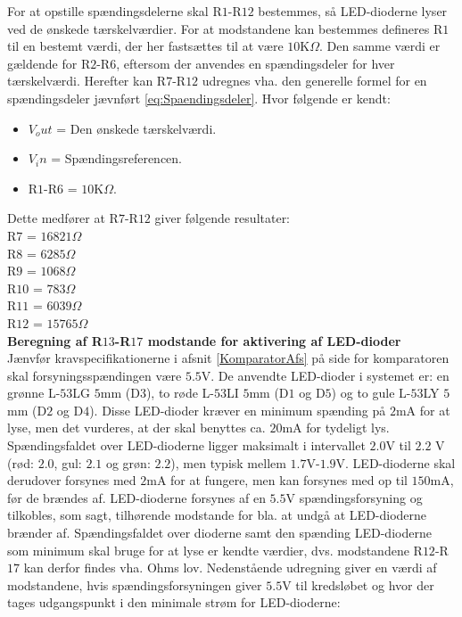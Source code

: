 For at opstille spændingsdelerne skal R$1$-R$12$ bestemmes, så LED-dioderne lyser ved de ønskede tærskelværdier. For at modstandene kan bestemmes defineres R$1$ til en bestemt værdi, der her fastsættes til at være $10$K$\Omega$. Den samme værdi er gældende for R$2$-R$6$, eftersom der anvendes en spændingsdeler for hver tærskelværdi. Herefter kan R$7$-R$12$ udregnes vha. den generelle formel for en spændingsdeler jævnført \eqref{eq:Spaendingsdeler}. Hvor følgende er kendt:
\begin{itemize}
\item $V_out$ = Den ønskede tærskelværdi.
\item $V_in$ = Spændingsreferencen.
\item R$1$-R$6$ = $10$K$\Omega$.
\end{itemize}

Dette medfører at R$7$-R$12$ giver følgende resultater:\\
R$7$ = $16821\Omega$ \\
R$8$ = $6285\Omega$ \\
R$9$ = $1068\Omega$ \\
R$10$ = $783\Omega$ \\
R$11$ = $6039\Omega$ \\
R$12$ = $15765\Omega$ \\


\noindent\textbf{Beregning af R$13$-R$17$ modstande for aktivering af LED-dioder} \\
Jænvfør kravspecifikationerne i afsnit \ref{KomparatorAfs} på side \pageref{KomparatorAfs} for komparatoren skal forsyningsspændingen være $5.5$V. De anvendte LED-dioder i systemet er: en grønne L-$53$LG $5$mm (D$3$), to røde L-$53$LI $5$mm (D$1$ og D$5$) og to gule L-$53$LY $5$mm (D$2$ og D$4$). Disse LED-dioder kræver en minimum spænding på $2$mA for at lyse, men det vurderes, at der skal benyttes ca. $20$mA for tydeligt lys.  Spændingsfaldet over LED-dioderne ligger maksimalt i intervallet $2.0$V til $2.2$ V (rød: $2.0$, gul: $2.1$ og grøn: $2.2$), men typisk mellem $1.7$V-$1.9$V. LED-dioderne skal derudover forsynes med $2$mA for at fungere, men kan forsynes med op til $150$mA, før de brændes af. LED-dioderne forsynes af en $5.5$V spændingsforsyning og tilkobles, som sagt, tilhørende modstande for bla. at undgå at LED-dioderne brænder af. Spændingsfaldet over dioderne samt den spænding LED-dioderne som minimum skal bruge for at lyse er kendte værdier, dvs. modstandene R$12$-R$17$ kan derfor findes vha. Ohms lov. Nedenstående udregning giver en værdi af modstandene, hvis spændingsforsyningen giver $5.5$V til kredsløbet og hvor der tages udgangspunkt i den minimale strøm for LED-dioderne:

